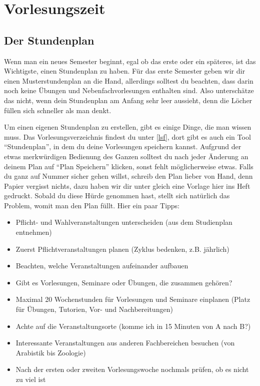 ﻿\chapter{Vorlesungszeit}

\section{Der Stundenplan}

Wenn man ein neues Semester beginnt, egal ob das erste oder ein späteres, ist das Wichtigste, einen Stundenplan zu haben. Für das erste Semester geben wir dir einen Musterstundenplan an die Hand, allerdings solltest du beachten, dass darin noch keine Übungen und Nebenfachvorlesungen enthalten sind. Also unterschätze das nicht, wenn dein Stundenplan am Anfang sehr leer aussieht, denn die Löcher füllen sich schneller als man denkt.

Um einen eigenen Stundenplan zu erstellen, gibt es einige Dinge, die man wissen
muss. Das Vorlesungsverzeichnis findest du unter \ref{lsf}, dort gibt es auch
ein Tool ``Stundenplan'', in dem du deine Vorlesungen speichern kannst.
Aufgrund der etwas merkwürdigen Bedienung des Ganzen solltest du nach jeder
Änderung an deinem Plan auf ``Plan Speichern'' klicken, sonst fehlt
möglicherweise etwas. Falls du ganz auf Nummer sicher gehen willst, schreib den
Plan lieber von Hand, denn Papier vergisst nichts, dazu haben wir dir unter
\pageref{studenplan} gleich eine Vorlage hier ins Heft gedruckt. Sobald du
diese Hürde genommen hast, stellt sich natürlich das Problem, womit man den
Plan füllt.  Hier ein paar Tipps:

\begin{itemize}
	\item Pflicht- und Wahlveranstaltungen unterscheiden (aus dem Studienplan entnehmen)
	\item Zuerst Pflichtveranstaltungen planen (Zyklus bedenken, z.B. jährlich)
	\item Beachten, welche Veranstaltungen aufeinander aufbauen
	\item Gibt es Vorlesungen, Seminare oder Übungen, die zusammen gehören?
	\item Maximal 20 Wochenstunden für Vorlesungen und Seminare einplanen (Platz für Übungen, Tutorien, Vor- und Nachbereitungen)
	\item Achte auf die Veranstaltungsorte (komme ich in 15 Minuten von A nach B?)
	\item Interessante Veranstaltungen aus anderen Fachbereichen besuchen (von Arabistik bis Zoologie)
	\item Nach der ersten oder zweiten Vorlesungswoche nochmals prüfen, ob es nicht zu viel ist
\end{itemize}


